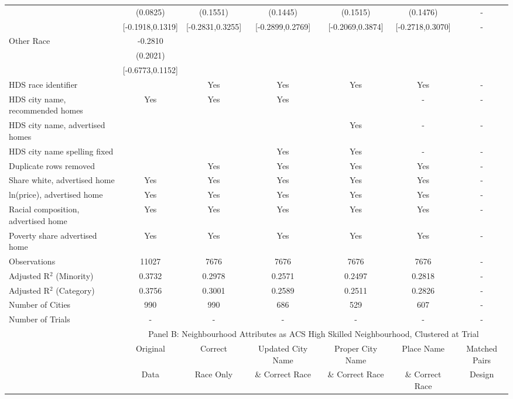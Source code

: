 \begin{table}[htbp]
{\begin{tabular}{l*{6}{c}}
 & (0.0825) & (0.1551) & (0.1445) & (0.1515) & (0.1476) & - \\
 & [-0.1918,0.1319] & [-0.2831,0.3255] & [-0.2899,0.2769] & [-0.2069,0.3874] & [-0.2718,0.3070] & - \\
Other Race & -0.2810 &  &  &  &  &  \\
 & (0.2021) &  &  &  &  &  \\
 & [-0.6773,0.1152] &  &  &  &  &  \\
\midrule
HDS race identifier & & Yes & Yes & Yes & Yes & - \\
HDS city name, recommended homes & Yes & Yes & Yes & & - & -\\
HDS city name, advertised homes &  &  &  & Yes & - & -\\
HDS city name spelling fixed & & & Yes & Yes & - & -\\
Duplicate rows removed &  & Yes & Yes & Yes & Yes & - \\
\midrule
Share white, advertised home  & Yes & Yes & Yes & Yes & Yes & - \\
ln(price), advertised home  & Yes & Yes & Yes & Yes & Yes & - \\
Racial composition, advertised home & Yes & Yes & Yes & Yes & Yes & - \\
Poverty share advertised home & Yes & Yes & Yes & Yes & Yes & - \\
Observations & 11027 & 7676 & 7676 & 7676 & 7676 & - \\
Adjusted R$^2$ (Minority) & 0.3732 & 0.2978 & 0.2571 & 0.2497 & 0.2818 & - \\
Adjusted R$^2$ (Category) & 0.3756 & 0.3001 & 0.2589 & 0.2511 & 0.2826 & - \\
Number of Cities & 990 & 990 & 686 & 529 & 607 & - \\
Number of Trials & - & - & - & - & - & - \\
\bottomrule
\toprule
& \multicolumn{6}{c}{Panel B: Neighbourhood Attributes as ACS High Skilled Neighbourhood, Clustered at Trial}\\
\toprule
                    &\multicolumn{1}{c}{Original}&\multicolumn{1}{c}{Correct}&\multicolumn{1}{c}{Updated City Name}&\multicolumn{1}{c}{Proper City Name}&\multicolumn{1}{c}{Place Name}&\multicolumn{1}{c}{Matched Pairs}\\
                      &\multicolumn{1}{c}{Data}&\multicolumn{1}{c}{Race Only}&\multicolumn{1}{c}{\& Correct Race}&\multicolumn{1}{c}{\& Correct Race}&\multicolumn{1}{c}{\& Correct Race}&\multicolumn{1}{c}{Design}\\                  

\end{tabular}}
\end{table}
